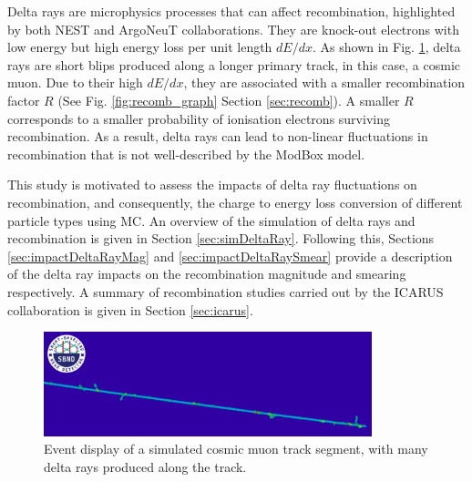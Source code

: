 Delta rays are microphysics processes that can affect recombination, highlighted by both NEST \cite{NEST} and ArgoNeuT \cite{argoneut_recomb} collaborations.
They are knock-out electrons with low energy but high energy loss per unit length $dE/dx$.
As shown in Fig. \ref{fig:delta_ray_evd}, delta rays are short blips produced along a longer primary track, in this case, a cosmic muon.                      
Due to their high $dE/dx$, they are associated with a smaller recombination factor $R$ (See Fig. \ref{fig:recomb_graph} Section \ref{sec:recomb}).
A smaller $R$ corresponds to a smaller probability of ionisation electrons surviving recombination.
As a result, delta rays can lead to non-linear fluctuations in recombination that is not well-described by the ModBox model.

This study is motivated to assess the impacts of delta ray fluctuations on recombination, and consequently, the charge to energy loss conversion of different particle types using MC.
An overview of the simulation of delta rays and recombination is given in Section \ref{sec:simDeltaRay}.%
Following this, Sections \ref{sec:impactDeltaRayMag} and \ref{sec:impactDeltaRaySmear} provide a description of the delta ray impacts on the recombination magnitude and smearing respectively.
A summary of recombination studies carried out by the ICARUS collaboration is given in Section \ref{sec:icarus}.

\begin{figure}[hb!] 
\centering    
\includegraphics[width=0.85\textwidth]{delta_ray_evd}
\caption[Event Display of a Cosmic Muon and Delta Rays]{
Event display of a simulated cosmic muon track segment, with many delta rays produced along the track.
}
\label{fig:delta_ray_evd}
\end{figure}


